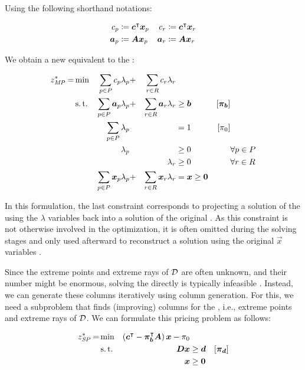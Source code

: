 Using the following shorthand notations:

\begin{equation}
\begin{aligned}
c_p &\coloneqq {\bm{c}}^\intercal {\bm{x}}_p
&c_r &\coloneqq {\bm{c}}^\intercal {\bm{x}}_r \\
{\bm{a}}_p &\coloneqq {\bm{A}} {\bm{x}}_p
&{\bm{a}}_r &\coloneqq {\bm{A}} {\bm{x}}_r
\end{aligned}
\end{equation}

We obtain a new \MP{} equivalent to the \LP{}:

\begin{equation}
\begin{aligned}
z^*_{\textit{MP}}{} = &\min & \sum_{p \in P} c_p \lambda_p &+ &\sum_{r \in R} c_r \lambda_r & & & \\
&\operatorname{s.t.} & \sum_{p \in P} {\bm{a}}_p \lambda_p &+ &\sum_{r \in R} {\bm{a}}_r \lambda_r & \geq {\bm{b}} & \left[{\bm{\pi}}_{\bm{b}}\right] \\
&& \sum_{p \in P} \lambda_p & & & = 1 & \left[\pi_0 \right] & \\
&& \lambda_p & & & \geq 0 & & \forall p \in P \\
&& & & \lambda_r & \geq 0 & & \forall r \in R \\
&& \sum_{p \in P} {\bm{x}}_p \lambda_p &+ &\sum_{r \in R} {\bm{x}}_r \lambda_r & = {\bm{x}} \geq {\bm{0}} & &
\end{aligned}
\end{equation}

In this formulation, the last constraint corresponds to projecting a solution of the \MP{} using the $\lambda$ variables back into a solution of the original \LP{}. As this constraint is not otherwise involved in the optimization, it is often omitted during the solving stages and only used afterward to reconstruct a solution using the original $\vec{x}$ variables \cite{thebook}.

Since the extreme points and extreme rays of $\mathcal{D}$ are often unknown, and their number might be enormous, solving the \MP{} directly is typically infeasible \cite{thebook}. Instead, we can generate these columns iteratively using column generation. For this, we need a subproblem that finds (improving) columns for the \MP{}, i.e., extreme points and extreme rays of $\mathcal{D}$. We can formulate this pricing problem as follows:

\begin{equation}
\begin{aligned}
z^*_\SP{} = &\min & \left( \vec{c}\transpose - \vec{\pi}_\vec{b}\transpose \mat{A} \right) \vec{x} - \pi_0 & & \\
&\st & \mat{D} \vec{x} & \geq \vec{d} & \left[\vec{\pi}_\vec{d}\right] \\
&& \vec{x} & \geq \vec{0}
\end{aligned}
\end{equation}

